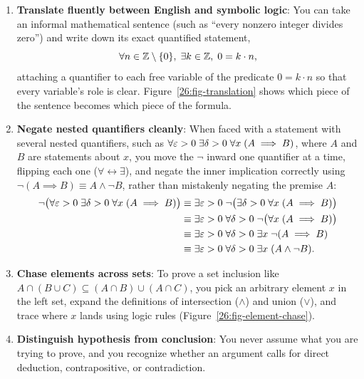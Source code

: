 \begin{enumerate}
\item \textbf{Translate fluently between English and symbolic logic}: You can take an informal mathematical sentence (such as ``every nonzero integer divides zero'') and write down its exact quantified statement,
\[
\forall n \in \mathbb{Z} \setminus \{0\}, \; \exists k \in \mathbb{Z}, \; 0 = k \cdot n,
\]
attaching a quantifier to each free variable of the predicate $0 = k \cdot n$ so that every variable's role is clear. Figure~\ref{26:fig-translation} shows which piece of the sentence becomes which piece of the formula.
\item \textbf{Negate nested quantifiers cleanly}: When faced with a statement with several nested quantifiers, such as $\forall \varepsilon > 0 \; \exists \delta > 0 \; \forall x \; (A \implies B)$, where $A$ and $B$ are statements about $x$, you move the $\neg$ inward one quantifier at a time, flipping each one ($\forall \leftrightarrow \exists$), and negate the inner implication correctly using $\neg(A \implies B) \equiv A \land \neg B$, rather than mistakenly negating the premise $A$:
\begin{align*}
\neg\bigl(\forall \varepsilon > 0 \; \exists \delta > 0 \; \forall x \; (A \implies B)\bigr)
  &\equiv \exists \varepsilon > 0 \; \neg\bigl(\exists \delta > 0 \; \forall x \; (A \implies B)\bigr) \\
  &\equiv \exists \varepsilon > 0 \; \forall \delta > 0 \; \neg\bigl(\forall x \; (A \implies B)\bigr) \\
  &\equiv \exists \varepsilon > 0 \; \forall \delta > 0 \; \exists x \; \neg(A \implies B) \\
  &\equiv \exists \varepsilon > 0 \; \forall \delta > 0 \; \exists x \; (A \land \neg B).
\end{align*}
\item \textbf{Chase elements across sets}: To prove a set inclusion like $A \cap (B \cup C) \subseteq (A \cap B) \cup (A \cap C)$, you pick an arbitrary element $x$ in the left set, expand the definitions of intersection ($\land$) and union ($\lor$), and trace where $x$ lands using logic rules (Figure~\ref{26:fig-element-chase}).
\item \textbf{Distinguish hypothesis from conclusion}: You never assume what you are trying to prove, and you recognize whether an argument calls for direct deduction, contrapositive, or contradiction.
\end{enumerate}

